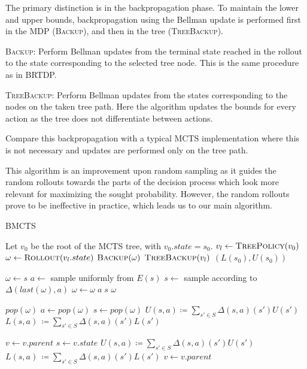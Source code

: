 The primary distinction is in the backpropagation phase. To maintain the lower
and upper bounds, backpropagation using the Bellman update is performed
first in the MDP (\textsc{Backup}), and then in the tree (\textsc{TreeBackup}).

\textsc{Backup}: Perform Bellman updates from the terminal state reached in the
rollout to the state corresponding to the selected tree node. This is
the same procedure as in BRTDP.

\textsc{TreeBackup}: Perform Bellman updates from the states
corresponding to the nodes on the taken tree path. Here the algorithm
updates the bounds for every action as the tree does not differentiate
between actions.

Compare this backpropagation with a typical MCTS implementation where
this is not necessary and updates are performed only on the tree path.


This algorithm is an improvement upon random sampling as it guides the
random rollouts towards the parts of the decision process which look
more relevant for maximizing the sought probability. However, the random
rollouts prove to be ineffective in practice, which leads us to our main
algorithm.

\newpage

\begin{algorithm}[H]
\caption{BMCTS}
\label{alg_bmcts}
\begin{algorithmic}
    \State Let $v_0$ be the root of the MCTS tree, with $v_0.state = s_0$.
        \State $v_l \gets \Call{TreePolicy}{v_0}$
        \State $\omega \gets \Call{Rollout}{v_l.state}$
        \State $\Call{Backup}{\omega}$
        \State $\Call{TreeBackup}{v_l}$
    \EndWhile
    \State \Return $(L(s_0), U(s_0))$
\EndFunction

    \State $\omega \gets s$
        \State $a \gets$ sample uniformly from $E(s)$
        \State $s \gets$ sample according to $\Delta(last(\omega),a)$
        \State $\omega \gets \omega \; a \; s$
    \EndWhile
    \State \Return $\omega$
\EndFunction

    \State $pop(\omega)$
    \State $a \gets pop(\omega)$
    \State $s \gets pop(\omega)$
    \State $U(s,a) \coloneqq \sum_{s' \in S} \Delta(s,a)(s')U(s')$
    \State $L(s,a)\, \coloneqq \sum_{s' \in S} \Delta(s,a)(s')L(s')$
\EndWhile
\EndFunction

\State $v \gets v.parent$ 
    \State $s \gets v.state$
        \State $U(s,a) \coloneqq \sum_{s' \in S} \Delta(s,a)(s')U(s')$
        \State $L(s,a)\, \coloneqq \sum_{s' \in S} \Delta(s,a)(s')L(s')$
    \EndFor
    \State $v \gets v.parent$
\EndWhile
\EndFunction
\end{algorithmic}
\end{algorithm}


